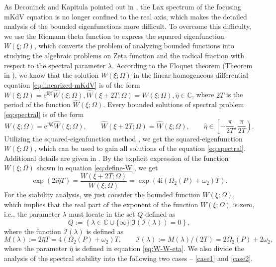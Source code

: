 \documentclass[11pt,reqno]{amsart}
\newcommand{\ii}{\mathrm{i}}
\newcommand{\ee}{\mathrm{e}}
\numberwithin{equation}{section}
\begin{document}
 
As Deconinck and Kapitula pointed out in \cite{DeconinckK-10}, the Lax spectrum of the focusing mKdV equation is no longer confined to the real axis, which makes the detailed analysis of the bounded eigenfunctions more difficult. 
To overcome this difficulty, we use the Riemann theta function to express the squared eigenfunction $W(\xi;\Omega)$, which converts the problem of analyzing bounded functions into studying the algebraic problems on Zeta function and the radical fraction with respect to the spectral parameter $\lambda$. 
According to the Floquet theorem (Theorem in \cite{DeconinckK-06,Floquet-83}), we know that the solution $W(\xi;\Omega)$ in the linear homogeneous differential equation \eqref{eq:linearized-mKdV} is of the form
$W(\xi;\Omega)=\ee^{\ii \hat{\eta} \xi} \hat{W}(\xi;\Omega), \hat{W}(\xi+2T;\Omega)=\hat{W}(\xi;\Omega),\hat{\eta}\in \mathbb{C}$, where $2T$ is the period of the function $\hat{W}(\xi ;\Omega )$. 
Every bounded solutions of spectral problem \eqref{eq:spectral} is of the form
\begin{equation}\label{eq:W-W-eta}
	W(\xi ;\Omega )=\ee^{\ii \hat{\eta} \xi  } \hat{W}(\xi ;\Omega ),\qquad \hat{W}(\xi  +2T;\Omega)=\hat{W}(\xi ;\Omega ),  \qquad \hat{\eta} \in  \left[-\frac{\pi}{2T},\frac{\pi }{2T}\right). 
\end{equation}
Utilizing the squared-eigenfunction method \cite{BottmanD-2009}, we get the squared-eigenfunction $W(\xi;\Omega)$, which can be used to gain all solutions of the equation \eqref{eq:spectral}. Additional details are given in .
By the explicit expression of the function $W(\xi;\Omega)$ shown in equation \eqref{eq:define-W}, we get
\begin{equation}\nonumber
	\exp{(2\ii \hat{\eta} T)}=\frac{W(\xi+2T;\Omega)}{W(\xi;\Omega)}
	=\exp{\left(4\ii \left(\Omega_2(P) + \omega_2 \right)T\right)}.
\end{equation}
For the stability analysis, we just consider the bounded function $W(\xi;\Omega)$, which implies that the real part of the exponent of the function $W(\xi;\Omega)$ is zero, i.e.,  the parameter $\lambda$ must locate in the set $Q$ defined as
\begin{equation}\label{eq:set-Q}
	Q:=\left\{  \lambda\in \mathbb{C}\cup\{\infty\}\left| {\Im}\left(\mathcal{I} (\lambda)\right)=0  \right. \right\},
\end{equation}
where the function $\mathcal{I}(\lambda)$ is defined as
\begin{equation}\label{eq:M}
	M(\lambda):=2\hat{\eta} T=4 \left(\Omega_2(P) + \omega_2 \right)T, \qquad 
	\mathcal{I}(\lambda):=M(\lambda)/(2T)=2\Omega_2(P) + 2\omega_2,
\end{equation}
where the parameter $\hat{\eta}$ is defined in equation \eqref{eq:W-W-eta}.
We also divide the analysis of the spectral stability into the following two cases -- \ref{case1} and \ref{case2}.
\end{document}
